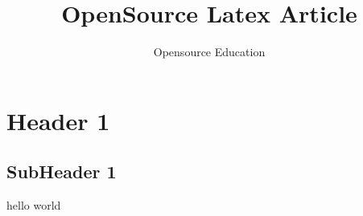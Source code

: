 \documentclass[11pt]{article}
\begin{document}
\title{OpenSource Latex Article }
\author{Opensource Education}
\maketitle


\section{Header 1}
\subsection{SubHeader 1}

hello world
\end{document}
